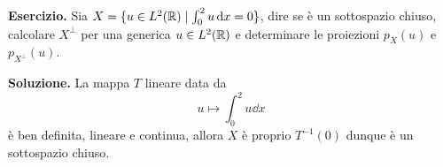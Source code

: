 

%


\textbf{Esercizio.}
Sia $X = \{ u \in L^2(\mathbb R) \mid \int_0^2 u \,\mathrm{d} x = 0 \}$, dire se è un sottospazio chiuso, calcolare $X^\perp$ per una generica $u \in L^2(\mathbb R)$ e determinare le proiezioni $p_X(u)$ e $p_{X^\perp}(u)$.

\textbf{Soluzione.}
La mappa $T$ lineare data da
$$
u \mapsto \int_0^2 u \dd x
$$
è ben definita, lineare e continua, allora $X$ è proprio $T^{-1}(0)$ dunque è un sottospazio chiuso. 

